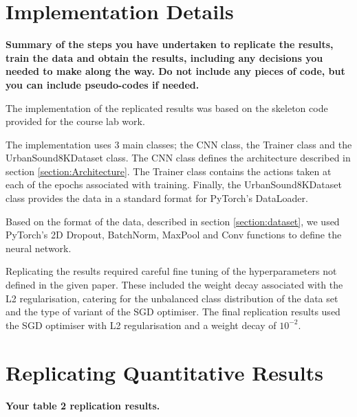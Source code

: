 \documentclass[conference]{IEEEtran}
\begin{document}
\section{Implementation Details}
\textbf{Summary of the steps you have undertaken to replicate the results, train the data and obtain the results, including any decisions you needed to make along the way. Do not include any pieces of code, but you can include pseudo-codes if needed. }

The implementation of the replicated results was based on the skeleton code provided for the course lab work.

The implementation uses 3 main classes; the CNN class, the Trainer class and the UrbanSound8KDataset class. The CNN class defines the architecture described in section \ref{section:Architecture}. The Trainer class contains the actions taken at each of the epochs associated with training. Finally, the UrbanSound8KDataset class provides the data in a standard format for PyTorch's DataLoader. 

Based on the format of the data, described in section \ref{section:dataset}, we used PyTorch's 2D Dropout, BatchNorm, MaxPool and Conv functions to define the neural network.

Replicating the results required careful fine tuning of the hyperparameters not defined in the given paper. These included the weight decay associated with the L2 regularisation, catering for the unbalanced class distribution of the data set and the type of variant of the SGD optimiser. The final replication results used the SGD optimiser with L2 regularisation and a weight decay of $10^{-2}$. 

\section{Replicating Quantitative Results}
\textbf{Your table 2 replication results. }
\end{document}
